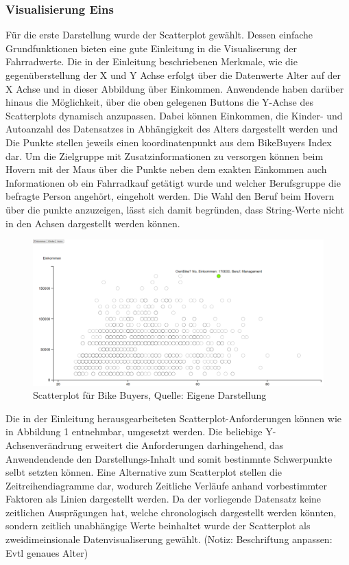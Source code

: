 \documentclass[usegeometry=true]{scrartcl}
\begin{document}
\subsubsection{Visualisierung Eins}
Für die erste Darstellung wurde der Scatterplot gewählt. Dessen einfache Grundfunktionen bieten eine gute Einleitung in die Visualiserung der Fahrradwerte. Die in der Einleitung beschriebenen Merkmale, wie die gegenüberstellung der X und Y Achse erfolgt über die Datenwerte Alter auf der X Achse und in dieser Abbildung über Einkommen. Anwendende haben darüber hinaus die Möglichkeit, über die oben gelegenen Buttons die Y-Achse des Scatterplots dynamisch anzupassen. Dabei können Einkommen, die Kinder- und Autoanzahl des Datensatzes in Abhängigkeit des Alters dargestellt werden und Die Punkte stellen jeweils einen koordinatenpunkt aus dem BikeBuyers Index dar. Um die Zielgruppe mit Zusatzinformationen zu versorgen können beim Hovern mit der Maus über die Punkte neben dem exakten Einkommen auch Informationen ob ein Fahrradkauf getätigt wurde und welcher Berufsgruppe die befragte Person angehört, eingeholt werden. Die Wahl den Beruf beim Hovern über die punkte  anzuzeigen, lässt sich damit begründen, dass String-Werte nicht in den Achsen dargestellt werden können. 
\begin{figure}[h]
\begin{center}
\includegraphics[width=16cm]{Bilder/Scatterplot.png}
\caption{Scatterplot für Bike Buyers, Quelle: Eigene Darstellung}
\end{center}
\end{figure}
Die in der Einleitung herausgearbeiteten Scatterplot-Anforderungen können wie in Abbildung 1 entnehmbar, umgesetzt werden. Die beliebige Y-Achsenverändrung erweitert die Anforderungen darhingehend, das Anwendendende den Darstellungs-Inhalt und somit bestinmnte Schwerpunkte selbt setzten können. 
Eine Alternative zum Scatterplot stellen die Zeitreihendiagramme dar, wodurch Zeitliche Verläufe anhand vorbestimmter Faktoren als Linien dargestellt werden. Da der vorliegende Datensatz keine zeitlichen Ausprägungen hat, welche chronologisch dargestellt werden könnten, sondern zeitlich unabhängige Werte beinhaltet wurde der Scatterplot als zweidimeinsionale Datenvisualiserung gewählt.
(Notiz: Beschriftung anpassen: Evtl genaues Alter)
\end{document}
